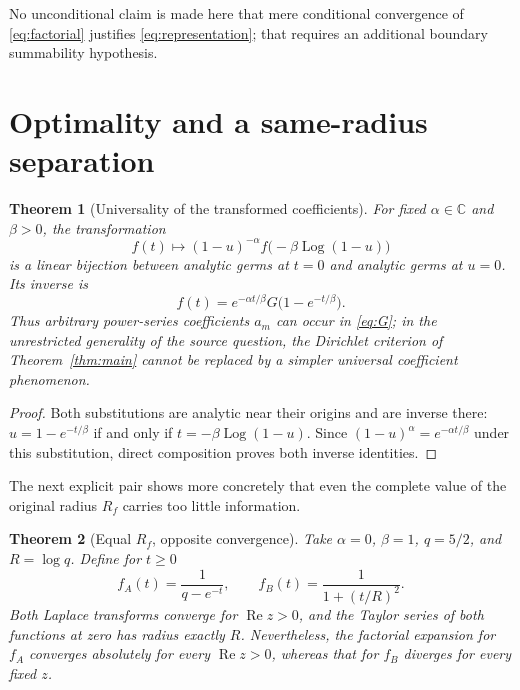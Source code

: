 \documentclass[11pt]{article}
\newtheorem{theorem}{Theorem}
\newcommand{\C}{\mathbb C}
\newcommand{\Log}{\operatorname{Log}}
\begin{document}
No unconditional claim is made here that mere conditional convergence of
\eqref{eq:factorial} justifies \eqref{eq:representation}; that requires an
additional boundary summability hypothesis.

\section{Optimality and a same-radius separation}

\begin{theorem}[Universality of the transformed coefficients]\label{thm:germ}
For fixed $\alpha\in\C$ and $\beta>0$, the transformation
\[
 f(t)\longmapsto
 (1-u)^{-\alpha}f\bigl(-\beta\Log(1-u)\bigr)
\]
is a linear bijection between analytic germs at $t=0$ and analytic germs at
$u=0$.  Its inverse is
\begin{equation}\label{eq:inverse}
 f(t)=e^{-\alpha t/\beta}G\bigl(1-e^{-t/\beta}\bigr).
\end{equation}
Thus arbitrary power-series coefficients $a_m$ can occur in
\eqref{eq:G}; in the unrestricted generality of the source question, the
Dirichlet criterion of Theorem~\ref{thm:main} cannot be replaced by a simpler
universal coefficient phenomenon.
\end{theorem}

\begin{proof}
Both substitutions are analytic near their origins and are inverse there:
$u=1-e^{-t/\beta}$ if and only if $t=-\beta\Log(1-u)$.  Since
$(1-u)^\alpha=e^{-\alpha t/\beta}$ under this substitution, direct composition
proves both inverse identities.
\end{proof}

The next explicit pair shows more concretely that even the complete value of
the original radius $R_f$ carries too little information.

\begin{theorem}[Equal $R_f$, opposite convergence]\label{thm:examples}
Take $\alpha=0$, $\beta=1$, $q=5/2$, and $R=\log q$.  Define for $t\geq0$
\[
 f_A(t)=\frac1{q-e^{-t}},
 \qquad
 f_B(t)=\frac1{1+(t/R)^2}.
\]
Both Laplace transforms converge for $\operatorname{Re}z>0$, and the Taylor
series of both functions at zero has radius exactly $R$.  Nevertheless, the
factorial expansion for $f_A$ converges absolutely for every
$\operatorname{Re}z>0$, whereas that for $f_B$ diverges for every fixed $z$.
\end{theorem}
\end{document}
